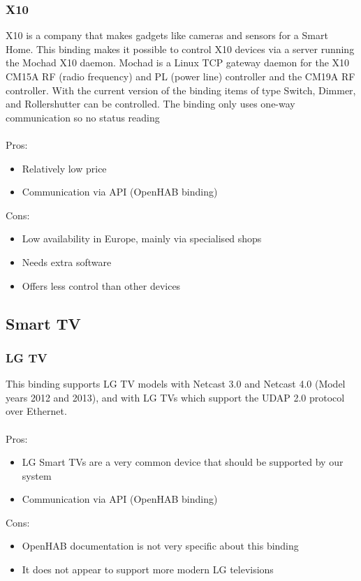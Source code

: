 \subsubsection{X10}
X10 is a company that makes gadgets like cameras and sensors for a Smart Home. This binding makes it possible to control X10
devices via a server running the Mochad X10 daemon. Mochad is a Linux TCP gateway daemon for the X10 CM15A RF (radio frequency)
and PL (power line) controller and the CM19A RF controller. With the current version of the binding items of type Switch, Dimmer, and
Rollershutter can be controlled. The binding only uses one-way communication so no status reading\\~\\
Pros:
\begin{itemize}
	\item Relatively low price
	\item Communication via API (OpenHAB binding)
\end{itemize}
Cons:
\begin{itemize}
	\item Low availability in Europe, mainly via specialised shops
	\item Needs extra software
	\item Offers less control than other devices
\end{itemize}

\subsection{Smart TV}

\subsubsection{LG TV}
This binding supports LG TV models with Netcast 3.0 and Netcast 4.0 (Model years 2012 and 2013), and with LG TVs which support the
UDAP 2.0 protocol over Ethernet.\\~\\
Pros:
\begin{itemize}
	\item LG Smart TVs are a very common device that should be supported by our system
	\item Communication via API (OpenHAB binding)
\end{itemize}
Cons:
\begin{itemize}
	\item OpenHAB documentation is not very specific about this binding
	\item It does not appear to support more modern LG televisions
\end{itemize}

